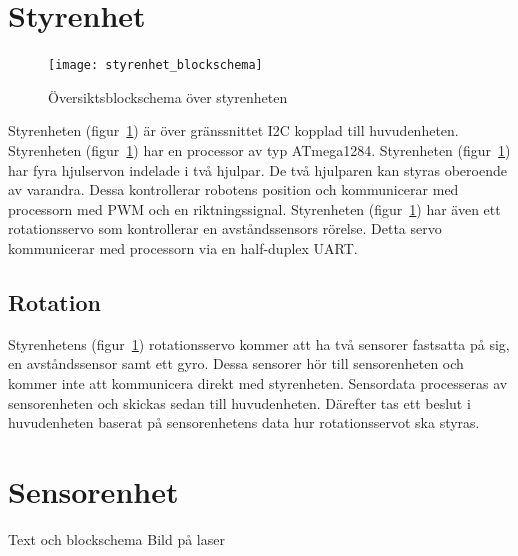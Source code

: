 \documentclass{article}
\begin{document}
\section{Styrenhet}
\begin{figure}[H]
\centering
\texttt{[image: styrenhet\_blockschema]}
\caption{Översiktsblockschema över styrenheten}
\label{fig:styrenhet}
\end{figure}
Styrenheten (figur~\ref{fig:styrenhet}) är över gränssnittet I2C kopplad till huvudenheten.\newline\newline
Styrenheten (figur~\ref{fig:styrenhet}) har en processor av typ ATmega1284.\newline\newline
Styrenheten (figur~\ref{fig:styrenhet}) har fyra hjulservon indelade i två hjulpar. De två hjulparen kan styras oberoende av varandra. Dessa kontrollerar robotens position och kommunicerar med processorn med PWM och en riktningssignal.\newline\newline
Styrenheten (figur~\ref{fig:styrenhet}) har även ett rotationsservo som kontrollerar en avståndssensors rörelse. Detta servo kommunicerar med processorn via en half-duplex UART.\newline\newline

\subsection{Rotation}
Styrenhetens (figur~\ref{fig:styrenhet}) rotationsservo kommer att ha två sensorer fastsatta på sig, en avståndssensor samt ett gyro. Dessa sensorer hör till sensorenheten och kommer inte att kommunicera direkt med styrenheten. Sensordata processeras av sensorenheten och skickas sedan till huvudenheten. Därefter tas ett beslut i huvudenheten baserat på sensorenhetens data hur rotationsservot ska styras. 


\section{Sensorenhet}
Text och blockschema
Bild på laser
\end{document}

